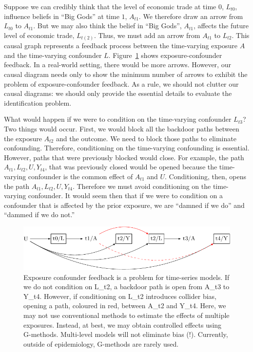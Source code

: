 \documentclass[
  singlecolumn]{report}
\begin{document}
Suppose we can credibly think that the level of economic trade at time
\(0\), \(L_{t0}\), influence beliefs in ``Big Gods'' at time \(1\),
\(A_{t1}\). We therefore draw an arrow from \(L_{t0}\) to \(A_{t1}\).
But we may also think the belief in ``Big Gods'', \(A_{t1}\), affects
the future level of economic trade, \(L_{t(2)}\). Thus, we must add an
arrow from \(A_{t1}\) to \(L_{t2}\). This causal graph represents a
feedback process between the time-varying exposure \(A\) and the
time-varying confounder \(L\). Figure~\ref{fig-dag-9} shows
exposure-confounder feedback. In a real-world setting, there would be
more arrows. However, our causal diagram needs only to show the minimum
number of arrows to exhibit the problem of exposure-confounder feedback.
As a rule, we should not clutter our causal diagrams: we should only
provide the essential details to evaluate the identification problem.

What would happen if we were to condition on the time-varying confounder
\(L_{t3}\)? Two things would occur. First, we would block all the
backdoor paths between the exposure \(A_{t2}\) and the outcome. We need
to block those paths to eliminate confounding. Therefore, conditioning
on the time-varying confounding is essential. However, paths that were
previously blocked would close. For example, the path
\(A_{t1}, L_{t2}, U, Y_{t4}\), that was previously closed would be
opened because the time-varying confounder is the common effect of
\(A_{t1}\) and \(U\). Conditioning, then, opens the path
\(A_{t1}, L_{t2}, U, Y_{t4}\). Therefore we must avoid conditioning on
the time-varying confounder. It would seem then that if we were to
condition on a confounder that is affected by the prior exposure, we are
``damned if we do'' and ``dammed if we do not.''

\begin{figure}

{\centering \includegraphics[width=1\textwidth,height=\textheight]{causal-dags_files/figure-pdf/fig-dag-9-1.pdf}

}

\caption{\label{fig-dag-9}Exposure confounder feedback is a problem for
time-series models. If we do not condition on L\_t2, a backdoor path is
open from A\_t3 to Y\_t4. However, if conditioning on L\_t2 introduces
collider bias, opening a path, coloured in red, between A\_t2 and Y\_t4.
Here, we may not use conventional methods to estimate the effects of
multiple exposures. Instead, at best, we may obtain controlled effects
using G-methods. Multi-level models will not eliminate bias (!).
Currently, outside of epidemiology, G-methods are rarely used.}

\end{figure}
\end{document}
